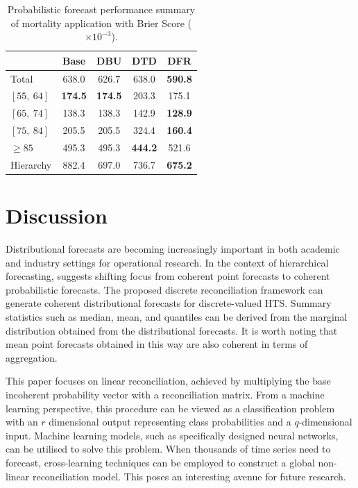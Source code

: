 \documentclass[a4paper,review,12pt,authoryear]{elsarticle}
\theoremstyle{definition}
\begin{document}
     \begin{table}
       \centering
       \caption{\label{tab:mortality_age} Probabilistic forecast performance summary of mortality application with Brier Score ($\times 10^{-3}$).}
       \begin{tabular}{lcccc}
       \toprule
       & Base & DBU & DTD & DFR \\\midrule
       Total & 638.0 & 626.7 & 638.0 & \textbf{590.8} \\
       $[55, ~ 64]$ & \textbf{174.5} & \textbf{174.5} & 203.3 & 175.1 \\
       $[65, ~ 74]$ & 138.3 & 138.3 & 142.9 & \textbf{128.9}\\
       $[75, ~ 84]$ & 205.5 & 205.5 & 324.4 & \textbf{160.4}\\
       $\ge 85$ & 495.3 & 495.3 & \textbf{444.2} & 521.6\\
       Hierarchy & 882.4 & 697.0 & 736.7 & \textbf{675.2} \\
       \bottomrule
      \end{tabular}
     \end{table}

     \section{Discussion}
     \label{sec:discussion}



     Distributional forecasts are becoming increasingly important in both academic and industry settings for operational research. In the context of hierarchical forecasting, \cite{kolassaWeWantCoherent2022} suggests shifting focus from coherent point forecasts to coherent probabilistic forecasts.
     The proposed discrete reconciliation framework can generate coherent distributional forecasts for discrete-valued HTS.
     Summary statistics such as median, mean, and quantiles can be derived from the marginal distribution obtained from the distributional forecasts.
     It is worth noting that mean point forecasts obtained in this way are also coherent in terms of aggregation.

     This paper focuses on linear reconciliation, achieved by multiplying the base incoherent probability vector with a reconciliation matrix.
     From a machine learning perspective, this procedure can be viewed as a classification problem with an $r$ dimensional output representing class probabilities and a $q$-dimensional input. Machine learning models, such as specifically designed neural networks, can be utilised to solve this problem.
     When thousands of time series need to forecast, cross-learning techniques can be employed to construct a global non-linear reconciliation model. This poses an interesting avenue for future research.
\end{document}
